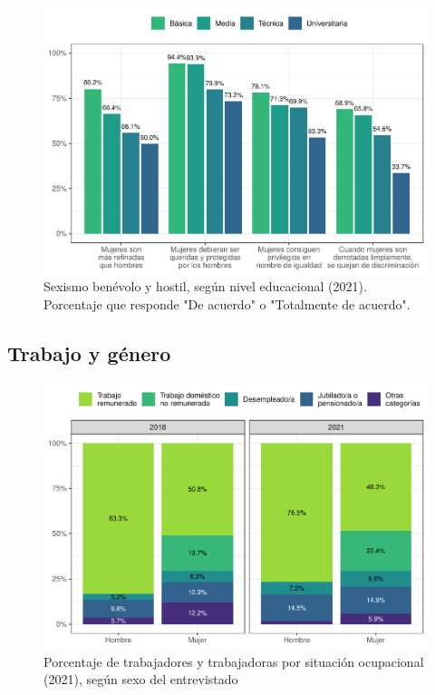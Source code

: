\documentclass[
  12pt,
]{book}
\begin{document}
\begin{figure}

{\centering \includegraphics{reporte-elsoc_files/figure-latex/sexismo-educ-1} 

}

\caption{Sexismo benévolo y hostil, según nivel educacional (2021). Porcentaje que responde "De acuerdo" o "Totalmente de acuerdo".}\label{fig:sexismo-educ}
\end{figure}

\hypertarget{trabajo-y-guxe9nero}{%
\subsection{Trabajo y género}\label{trabajo-y-guxe9nero}}

\begin{figure}

{\centering \includegraphics{reporte-elsoc_files/figure-latex/ocup-sexo-1} 

}

\caption{Porcentaje de trabajadores y trabajadoras por situación ocupacional (2021), según sexo del entrevistado}\label{fig:ocup-sexo}
\end{figure}
\end{document}
